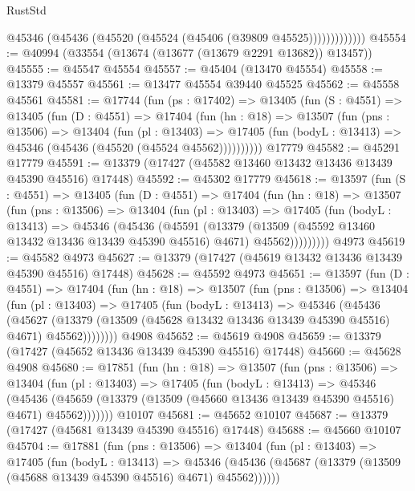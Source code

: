 \begin{lexlean}{RustStd}
\begin{coremodule}
                  @45346 (@45436 (@45520 (@45524 (@45406 (@39809 @45525)))))))))))))
@45554 := @40994 (@33554 (@13674 (@13677 (@13679 @2291 @13682)) @13457))
@45555 := @45547 @45554
@45557 := @45404 (@13470 @45554)
@45558 := @13379 @45557
@45561 := @13477 @45554 @39440 @45525
@45562 := @45558 @45561
@45581 := @17744
    (fun (ps : @17402) =>
    @13405
      (fun (S : @4551) =>
      @13405
        (fun (D : @4551) =>
        @17404
          (fun (hn : @18) =>
          @13507
            (fun (pns : @13506) =>
            @13404
              (fun (pl : @13403) =>
              @17405 (fun (bodyL : @13413) => @45346 (@45436 (@45520 (@45524 @45562))))))))))
    @17779
@45582 := @45291 @17779
@45591 := @13379 (@17427 (@45582 @13460 @13432 @13436 @13439 @45390 @45516) @17448)
@45592 := @45302 @17779
@45618 := @13597
    (fun (S : @4551) =>
    @13405
      (fun (D : @4551) =>
      @17404
        (fun (hn : @18) =>
        @13507
          (fun (pns : @13506) =>
          @13404
            (fun (pl : @13403) =>
            @17405
              (fun (bodyL : @13413) =>
              @45346
                (@45436
                  (@45591
                    (@13379
                      (@13509 (@45592 @13460 @13432 @13436 @13439 @45390 @45516) @4671)
                      @45562)))))))))
    @4973
@45619 := @45582 @4973
@45627 := @13379 (@17427 (@45619 @13432 @13436 @13439 @45390 @45516) @17448)
@45628 := @45592 @4973
@45651 := @13597
    (fun (D : @4551) =>
    @17404
      (fun (hn : @18) =>
      @13507
        (fun (pns : @13506) =>
        @13404
          (fun (pl : @13403) =>
          @17405
            (fun (bodyL : @13413) =>
            @45346
              (@45436
                (@45627
                  (@13379 (@13509 (@45628 @13432 @13436 @13439 @45390 @45516) @4671) @45562))))))))
    @4908
@45652 := @45619 @4908
@45659 := @13379 (@17427 (@45652 @13436 @13439 @45390 @45516) @17448)
@45660 := @45628 @4908
@45680 := @17851
    (fun (hn : @18) =>
    @13507
      (fun (pns : @13506) =>
      @13404
        (fun (pl : @13403) =>
        @17405
          (fun (bodyL : @13413) =>
          @45346
            (@45436
              (@45659 (@13379 (@13509 (@45660 @13436 @13439 @45390 @45516) @4671) @45562)))))))
    @10107
@45681 := @45652 @10107
@45687 := @13379 (@17427 (@45681 @13439 @45390 @45516) @17448)
@45688 := @45660 @10107
@45704 := @17881
    (fun (pns : @13506) =>
    @13404
      (fun (pl : @13403) =>
      @17405
        (fun (bodyL : @13413) =>
        @45346 (@45436 (@45687 (@13379 (@13509 (@45688 @13439 @45390 @45516) @4671) @45562))))))

\end{coremodule}
\end{lexlean}
